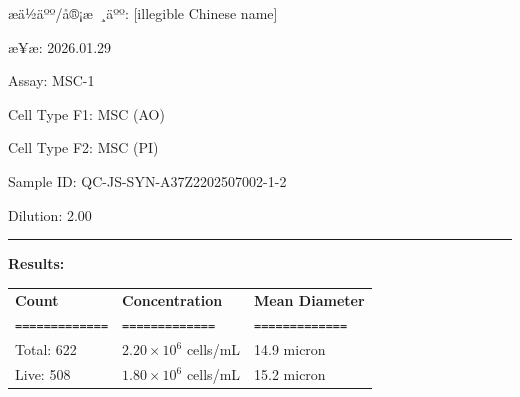 \documentclass[UTF8,10pt,a4paper,fontset=fandol]{ctexart}
\renewcommand{\arraystretch}{1.15}
\newcommand{\fieldvalue}[1]{#1}
\newcommand{\handwritten}[1]{#1}
\begin{document}
\begin{center}
\begin{center}
\medskip

æä½äºº/å®¡æ ¸äºº: %
\fieldvalue{\handwritten{[illegible Chinese name]}}

\hfill

æ¥æ: %
\fieldvalue{\handwritten{2026.01.29}}

\newpage

\noindent
Assay:
\fieldvalue{MSC-1}

\medskip
\noindent
Cell Type F1:
\fieldvalue{MSC (AO)}

\noindent
Cell Type F2:
\fieldvalue{MSC (PI)}

\medskip
\noindent
Sample ID:
\fieldvalue{QC-JS-SYN-A37Z2202507002-1-2}

\noindent
Dilution:
\fieldvalue{2.00}

\bigskip
\noindent\rule{\textwidth}{0.4pt}

\noindent\textbf{Results:}

\medskip
\renewcommand{\arraystretch}{1.2}
\begin{tabularx}{\textwidth}{@{}X X X@{}}
\textbf{Count} & \textbf{Concentration} & \textbf{Mean Diameter} \\
\texttt{=============} & \texttt{=============} & \texttt{=============} \\

Total:
\fieldvalue{622}
&
\fieldvalue{$2.20\times10^{6}$ cells/mL}
&
\fieldvalue{14.9 micron}
\\

Live:
\fieldvalue{508}
&
\fieldvalue{$1.80\times10^{6}$ cells/mL}
&
\fieldvalue{15.2 micron}
\\


\end{tabularx}
\end{center}
\end{center}
\end{document}
